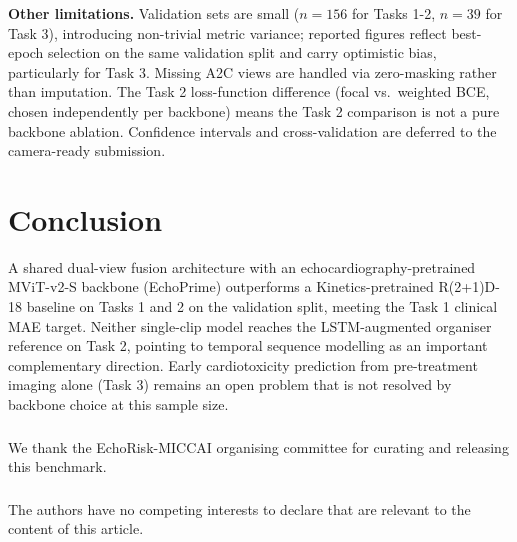 \documentclass[runningheads]{llncs}
\begin{document}
\noindent\textbf{Other limitations.} Validation sets are small ($n=156$ for Tasks 1-2, $n=39$ for Task 3), introducing non-trivial metric variance; reported figures reflect best-epoch selection on the same validation split and carry optimistic bias, particularly for Task 3. Missing A2C views are handled via zero-masking rather than imputation. The Task 2 loss-function difference (focal vs.\ weighted BCE, chosen independently per backbone) means the Task 2 comparison is not a pure backbone ablation. Confidence intervals and cross-validation are deferred to the camera-ready submission.

\section{Conclusion}

A shared dual-view fusion architecture with an echocardiography-pretrained MViT-v2-S backbone (EchoPrime) outperforms a Kinetics-pretrained R(2+1)D-18 baseline on Tasks 1 and 2 on the validation split, meeting the Task 1 clinical MAE target. Neither single-clip model reaches the LSTM-augmented organiser reference on Task 2, pointing to temporal sequence modelling as an important complementary direction. Early cardiotoxicity prediction from pre-treatment imaging alone (Task 3) remains an open problem that is not resolved by backbone choice at this sample size.

\begin{credits}
\subsubsection{\ackname}
We thank the EchoRisk-MICCAI organising committee for curating and releasing this benchmark.

\subsubsection{\discintname}
The authors have no competing interests to declare that are relevant to the content of this article.
\end{credits}
\end{document}
